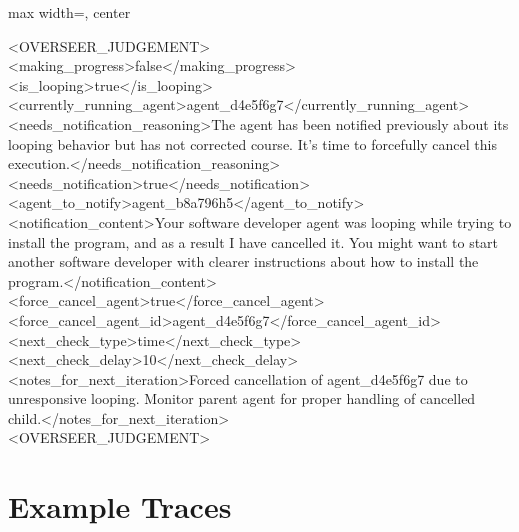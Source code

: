 {
\begin{adjustbox}{max width=\linewidth, center}
\begin{tracebox}
<OVERSEER\_JUDGEMENT>\\
<making\_progress>false</making\_progress>\\
<is\_looping>true</is\_looping>\\
<currently\_running\_agent>agent\_d4e5f6g7</currently\_running\_agent>\\
<needs\_notification\_reasoning>The agent has been notified previously about its looping behavior but has not corrected course. It's time to forcefully cancel this execution.</needs\_notification\_reasoning>\\
<needs\_notification>true</needs\_notification>\\
<agent\_to\_notify>agent\_b8a796h5</agent\_to\_notify>\\
<notification\_content>Your software developer agent was looping while trying to install the program, and as a result I have cancelled it. You might want to start another software developer with clearer instructions about how to install the program.</notification\_content>\\
<force\_cancel\_agent>true</force\_cancel\_agent>\\
<force\_cancel\_agent\_id>agent\_d4e5f6g7</force\_cancel\_agent\_id>\\
<next\_check\_type>time</next\_check\_type>\\
<next\_check\_delay>10</next\_check\_delay>\\
<notes\_for\_next\_iteration>Forced cancellation of agent\_d4e5f6g7 due to unresponsive looping. Monitor parent agent for proper handling of cancelled child.</notes\_for\_next\_iteration>\\
<OVERSEER\_JUDGEMENT>
\end{tracebox}
\end{adjustbox}
}

\section{Example Traces}%
\label{subsec:traces}

